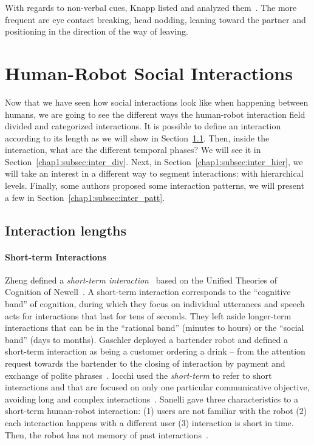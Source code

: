 \documentclass[a4paper,11pt,twoside]{StyleThese}
\begin{document}
With regards to non-verbal cues, Knapp \etal{} listed and analyzed them~\cite{knapp_1973_rhetoric}. The more frequent are eye contact breaking, head nodding, leaning toward the partner and positioning in the direction of the way of leaving.

\section{Human-Robot Social Interactions}

Now that we have seen how social interactions look like when happening between humans, we are going to see the different ways the human-robot interaction field divided and categorized interactions. It is possible to define an interaction according to its length as we will show in Section~\ref{chap1:subsec:inter_lengths}. Then, inside the interaction, what are the different temporal phases? We will see it in Section~\ref{chap1:subsec:inter_div}. Next, in Section~\ref{chap1:subsec:inter_hier}, we will take an interest in a different way to segment interactions: with hierarchical levels. Finally, some authors proposed some interaction patterns, we will present a few in Section~\ref{chap1:subsec:inter_patt}.

\subsection{Interaction lengths}\label{chap1:subsec:inter_lengths}
\paragraph{Short-term Interactions}
Zheng \etal{} defined a \textit{short-term interaction}~\cite{zheng_2013_designing} based on the Unified Theories of Cognition of Newell~\cite{newell_1994_unified}. A short-term interaction corresponds to the ``cognitive band'' of cognition, during which they focus on individual utterances and speech acts for interactions that last for tens of seconds. They left aside longer-term interactions that can be in the ``rational band'' (minutes to hours) or the ``social band'' (days to months).
Gaschler \etal{} deployed a bartender robot and defined a short-term interaction as being a customer ordering a drink – from the attention request towards the bartender to the closing of interaction by payment and exchange of polite phrases~\cite{gaschler_2012_modelling}.
Iocchi \etal{} used the \textit{short-term} to refer to short interactions and that are focused on only one particular communicative objective, avoiding long and complex interactions~\cite{iocchi_2015_personalized}.
Sanelli \etal{} gave three characteristics to a short-term human-robot interaction: (1) users are not familiar with the robot (2) each interaction happens with a different user (3) interaction is short in time. Then, the robot has not memory of past interactions~\cite{sanelli_2017_short}.
\end{document}
